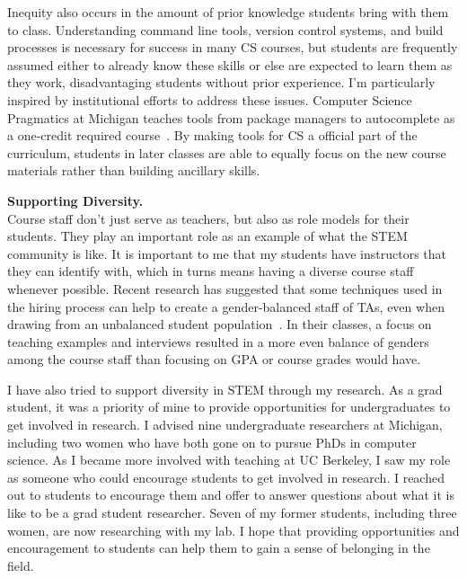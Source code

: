 \documentclass[11pt]{article} %
\begin{document}
Inequity also occurs in the amount of prior knowledge students bring with them
to class.
%
Understanding command line tools, version control systems, and build processes
is necessary for success in many CS courses, but students are frequently
assumed either to already know these skills or else are expected to learn them
as they work, disadvantaging students without prior experience.
%
I'm particularly inspired by institutional efforts to address these issues.
Computer Science Pragmatics at Michigan teaches tools from package managers to
autocomplete as a one-credit required course~\footnotemark{}.
%
By making tools for CS a official part of the curriculum, students in later
classes are able to equally focus on the new course materials rather than
building ancillary skills.


\bigskip
\textbf{\textsf{\large Supporting Diversity.}}\\
Course staff don't just serve as teachers, but also as role models for their
students. They play an important role as an example of what the STEM community
is like.
%
It is important to me that my students have instructors that they can identify
with, which in turns means having a diverse course staff whenever possible.
%
Recent research has suggested that some techniques used in the hiring process
can help to create a gender-balanced staff of TAs, even when drawing from an
unbalanced student population~\footnotemark{}. In their classes, a focus on
teaching examples and interviews resulted in a more even balance of genders
among the course staff than focusing on GPA or course grades would have.


I have also tried to support diversity in STEM through my research.
%
As a grad student, it was a priority of mine to provide opportunities for
undergraduates to get involved in research. I advised nine undergraduate
researchers at Michigan, including two women who have both gone on to
pursue PhDs in computer science.
%
As I became more involved with teaching at UC Berkeley, I saw my role as
someone who could encourage students to get involved in research. I reached out
to students to encourage them and offer to answer questions about what it is
like to be a grad student researcher. Seven of my former students, including
three women, are now researching with my lab.
%
I hope that providing opportunities and encouragement to students can help them
to gain  a sense of belonging in  the field.
\end{document}
